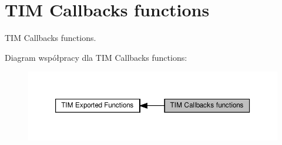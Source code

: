 \hypertarget{group___t_i_m___exported___functions___group9}{}\section{T\+IM Callbacks functions}
\label{group___t_i_m___exported___functions___group9}


T\+IM Callbacks functions.  


Diagram współpracy dla T\+IM Callbacks functions\+:\nopagebreak
\begin{figure}[H]
\begin{center}
\leavevmode
\includegraphics[width=350pt]{group___t_i_m___exported___functions___group9}
\end{center}
\end{figure}
